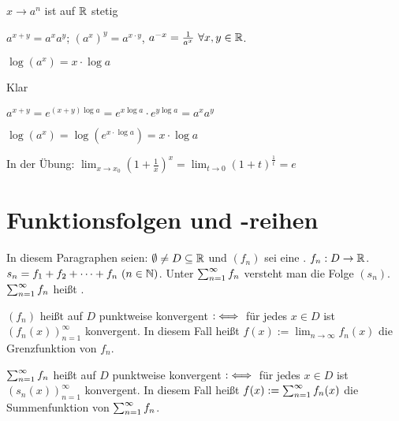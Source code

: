 \documentclass[a4paper,twoside,DIV15,BCOR12mm]{scrbook}
\begin{document}
\begin{eigenschaften}
\begin{liste}
\item $x \to a^n$ ist auf $\mathbb{R}$ stetig
\item $a^{x+y} = a^xa^y$; $(a^x)^y = a^{x\cdot y}$, $a^{-x} = \frac{1}{a^x}\ \forall x,y \in\mathbb{R}$.
\item $\log (a^x) = x\cdot \log a$
\end{liste}

\begin{beweise}
\item Klar
\item $a^{x+y} = e^{(x+y) \log a} = e^{x\log a} \cdot e^{y\log a} = a^xa^y$
\item $\log (a^x) = \log (e^{x\cdot \log a}) = x \cdot \log a$
\end{beweise}

In der Übung: $\displaystyle\lim_{x \to x_0} (1+\frac{1}{x})^x = \lim_{t \to 0} (1+t)^\frac{1}{t} = e$
\end{eigenschaften}

\chapter{Funktionsfolgen und -reihen}

In diesem Paragraphen seien: $\emptyset \ne D \subseteq \mathbb{R}$ und $(f_n)$ sei eine . $f_n:D\to\mathbb{R}$. $s_n = f_1 + f_2 + \cdots + f_n\ (n\in\mathbb{N})$. Unter $\sum_{n=1}^{\infty}{f_n}$ versteht man die Folge $(s_n)$. $\sum_{n=1}^{\infty}{f_n}$ heißt .

\begin{definition}
$(f_n)$ heißt auf $D$ punktweise konvergent $:\iff$ für jedes $x\in D$ ist $(f_n(x))_{n=1}^\infty$ konvergent. In diesem Fall heißt $f(x) := \displaystyle\lim_{n\to\infty} f_n(x)$ die Grenzfunktion von $f_n$.

$\sum_{n=1}^{\infty}{f_n}$ heißt auf $D$ punktweise konvergent $:\iff$ für jedes $x\in D$ ist $(s_n(x))_{n=1}^\infty$ konvergent. In diesem Fall heißt $f(x) := \sum_{n=1}^{\infty}{f_n(x)}$ die Summenfunktion von $\sum_{n=1}^{\infty}{f_n}$.
\end{definition}
\end{document}
